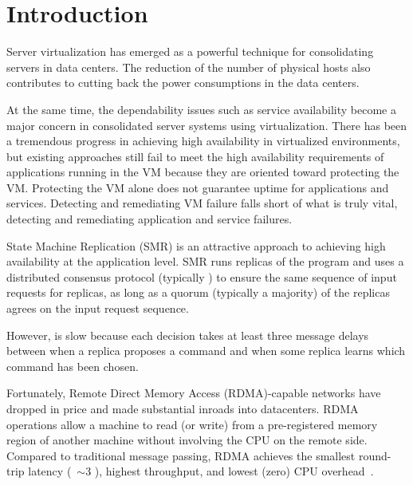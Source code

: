\section{Introduction} \label{sec:intro}

Server virtualization has emerged as a powerful technique for consolidating servers in 
data centers. The reduction of the number of physical hosts also contributes to cutting 
back the power consumptions in the data centers.


At the same time, the dependability issues such as service availability become a major concern 
in consolidated server systems using virtualization. There has been a tremendous progress in 
achieving high availability in virtualized environments, but existing approaches still fail to 
meet the high availability requirements of applications running in the VM because they are oriented 
toward protecting the VM. Protecting the VM alone does not guarantee uptime for applications and
services. Detecting and remediating VM failure falls short of what is truly vital, detecting and 
remediating application and service failures.

State Machine Replication (SMR) is an attractive approach to achieving high availability at the 
application level. SMR runs replicas of the program and uses a distributed consensus protocol 
(typically \paxos) to ensure the same sequence of input requests for replicas, as long as a 
quorum (typically a majority) of the replicas agrees on the input request sequence.

However, \paxos is slow because each decision takes at least three message delays between when 
a replica proposes a command and when some replica learns which command has been chosen.

Fortunately, Remote Direct Memory Access (RDMA)-capable networks have dropped in price and made 
substantial inroads into datacenters. RDMA operations allow a machine to read (or write) from a 
pre-registered memory region of another machine without involving the CPU on the remote side. 
Compared to traditional message passing, RDMA achieves the smallest round-trip latency 
(~$\sim$3 \us), highest throughput, and lowest (zero) CPU overhead~\cite{pilaf:usenix14}.

